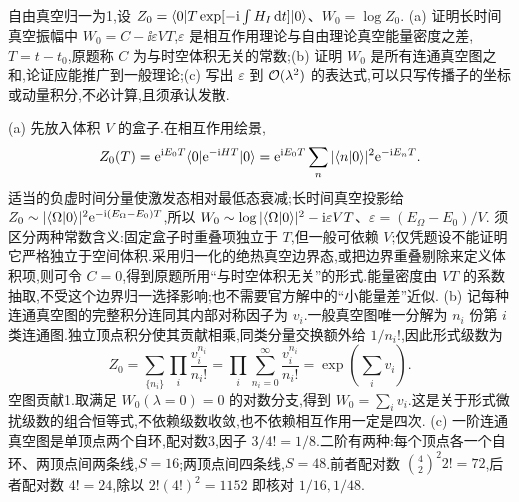 \begin{exercise}
自由真空归一为1,设 $Z_0=\langle 0\rvert T\exp[-\mathrm i\int H_I\,\mathrm d t]\lvert 0\rangle$、$W_0=\log Z_0$.
(a) 证明长时间真空振幅中 $W_0=C-\ii\varepsilon VT$,$\varepsilon$ 是相互作用理论与自由理论真空能量密度之差,$T=t-t_0$,原题称 $C$ 为与时空体积无关的常数;(b) 证明 $W_0$ 是所有连通真空图之和,论证应能推广到一般理论;(c) 写出 $\varepsilon$ 到 $\mathcal O(\lambda^2)$ 的表达式,可以只写传播子的坐标或动量积分,不必计算,且须承认发散.
\end{exercise}
\begin{solution}
(a) 先放入体积 $V$ 的盒子.在相互作用绘景,
\[
Z_0(T)=\mathrm e^{\mathrm i E_0T}\langle 0\rvert\mathrm e^{-\mathrm i HT}\lvert 0\rangle
=\mathrm e^{\mathrm i E_0T}\sum_n|\langle n\vert 0\rangle|^2\mathrm e^{-\mathrm i E_nT}.
\]
适当的负虚时间分量使激发态相对最低态衰减;长时间真空投影给
$Z_0\sim|\langle \Omega\vert 0\rangle|^2\mathrm e^{-\mathrm i(E_\Omega-E_0)T}$,所以
$W_0\sim\log|\langle \Omega\vert 0\rangle|^2-\mathrm i\varepsilon VT$、$\varepsilon=(E_\Omega-E_0)/V$.
须区分两种常数含义:固定盒子时重叠项独立于 $T$,但一般可依赖 $V$;仅凭题设不能证明它严格独立于空间体积.采用归一化的绝热真空边界态,或把边界重叠剔除来定义体积项,则可令 $C=0$,得到原题所用“与时空体积无关”的形式.能量密度由 $VT$ 的系数抽取,不受这个边界归一选择影响;也不需要官方解中的“小能量差”近似.
(b) 记每种连通真空图的完整积分连同其内部对称因子为 $v_i$.一般真空图唯一分解为 $n_i$ 份第 $i$ 类连通图.独立顶点积分使其贡献相乘,同类分量交换额外给 $1/n_i!$,因此形式级数为
\[
Z_0=\sum_{\{n_i\}}\prod_i\frac{v_i^{n_i}}{n_i!}
=\prod_i\sum_{n_i=0}^\infty\frac{v_i^{n_i}}{n_i!}
=\exp\left(\sum_i v_i\right).
\]
空图贡献1.取满足 $W_0(\lambda=0)=0$ 的对数分支,得到 $W_0=\sum_i v_i$.这是关于形式微扰级数的组合恒等式,不依赖级数收敛,也不依赖相互作用一定是四次.
(c) 一阶连通真空图是单顶点两个自环,配对数3,因子 $3/4!=1/8$.二阶有两种:每个顶点各一个自环、两顶点间两条线,$S=16$;两顶点间四条线,$S=48$.前者配对数 $\binom42^2 2!=72$,后者配对数 $4!=24$,除以 $2!(4!)^2=1152$ 即核对 $1/16,1/48$.
\begin{center}
\end{center}
\end{solution}
